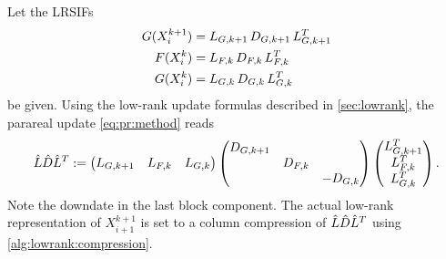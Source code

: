 Let the \acp{LRSIF}
\begin{equation}
\begin{aligned}
  G(X^{k+1}_i) &= \mathop{L_{G,k+1}} \mathop{D_{G,k+1}} \mathop{L_{G,k+1}^T} \\
  F(X^k_i)     &= \mathop{L_{F,k}}   \mathop{D_{F,k}}   \mathop{L_{F,k}^T} \\
  G(X^k_i)     &= \mathop{L_{G,k}}   \mathop{D_{G,k}}   \mathop{L_{G,k}^T}
\end{aligned}
\end{equation}
be given.
Using the low-rank update formulas described in \autoref{sec:lowrank},
the parareal update \eqref{eq:pr:method} reads
\begin{equation}
  \hat L \hat D \hat L^T :=
  \begin{pmatrix}
    L_{G,k+1} &
    L_{F,k} &
    L_{G,k}
  \end{pmatrix}
  \begin{pmatrix}
    D_{G,k+1} \\
    & D_{F,k} \\
    && -D_{G,k}
  \end{pmatrix}
  \begin{pmatrix}
    L_{G,k+1}^T \\
    L_{F,k}^T \\
    L_{G,k}^T
  \end{pmatrix}
  .
\end{equation}
Note the downdate in the last block component.
The actual low-rank representation of $X^{k+1}_{i+1}$ is set to a column compression of $\hat L \hat D \hat L^T$
using \autoref{alg:lowrank:compression}.


